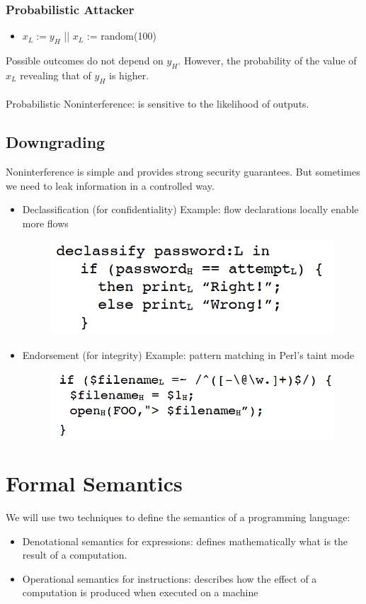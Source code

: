 \documentclass[10pt,a4paper]{report}
\begin{document}
\subsubsection{Probabilistic Attacker}
\begin{itemize}
\item $x_L := y_H$ || $x_L$ := random(100)
\end{itemize}
Possible outcomes do not depend on $y_H$. However, the probability of the value of $x_L$ revealing that of $y_H$ is higher.\\
\\
Probabilistic Noninterference: is sensitive to the likelihood of outputs.
\subsection{Downgrading}
Noninterference is simple and provides strong security guarantees. But sometimes we need to leak information in a controlled way.
\begin{itemize}
\item Declassification (for confidentiality)
Example: flow declarations locally enable more flows
\begin{figure}[H]
\centering
\includegraphics[scale=0.5]{3.png}
\end{figure}
\item Endorsement (for integrity)
Example: pattern matching in Perl’s taint mode
\begin{figure}[H]
\centering
\includegraphics[scale=0.5]{4.png}
\end{figure}
\end{itemize}
\section{Formal Semantics}
We will use two techniques to define the semantics of a programming language:
\begin{itemize}
\item Denotational semantics for expressions: defines mathematically what is the result of a computation.
\item Operational semantics for instructions: describes how the effect of a computation is produced when executed on a machine
\end{itemize}
\end{document}
